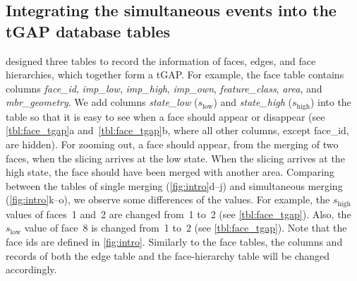 \documentclass[twocolumn]{svjour3}          %
\begin{document}
\subsection{Integrating the simultaneous events into the tGAP database tables}
\label{sec:integrate_tgap}

\citet[]{Meijers2011Thesis} designed three tables 
to record the information of
faces, edges, and face hierarchies, 
which together form a tGAP.
For example, the face table contains columns \emph{face\_id}, 
\emph{imp\_low}, \emph{imp\_high}, \emph{imp\_own},
\emph{feature\_class}, \emph{area}, and \emph{mbr\_geometry}.
We add columns \emph{state\_low} ($s_\mathrm{low}$) 
and \emph{state\_high} ($s_\mathrm{high}$) into the table 
so that it is easy to see when a face should appear or disappear 
(see \tabls\ref{tbl:face_tgap}a and~\ref{tbl:face_tgap}b,
where all other columns, except face\_id, are hidden).
For zooming out, a face should appear, 
from the merging of two faces,
when the slicing arrives at the low state.
When the slicing arrives at the high state,
the face should have been merged with another area.
Comparing between the tables of single merging 
(\figs\ref{fig:intro}d--j)
and simultaneous merging (\figs\ref{fig:intro}k--o),
we observe some differences of the values.
For example, the $s_\mathrm{high}$ values of faces~1 and~2 are changed from~1 to~2
(see \tabl\ref{tbl:face_tgap}).
Also, the $s_\mathrm{low}$ value of face~8 is changed from~1 to~2
(see \tabl\ref{tbl:face_tgap}).
Note that the face ids are defined in \fig\ref{fig:intro}.
Similarly to the face tables, 
the columns and records of both the edge table and the face-hierarchy table 
will be changed accordingly.
\end{document}
